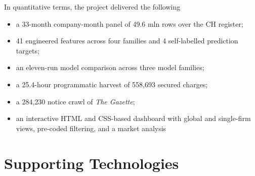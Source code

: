 \documentclass[    author={Samuel Menon Demelo; Sneha Saphala Ram Prasad; 
Viktor Ander Lindholm; Vishal Khatri},
               supervisor={Prof. Fernando Moreno-Pino},
                   degree={MSc},
                    title={Lloyds Commercial Banking Intelligence},
                 subtitle={Ranking SME Lending, Risk and Growth Prospects for Lloyds Banking Group},
                     type={},
                     year={2026}]{dissertation}
\begin{document}
\noindent
In quantitative terms, the project delivered the following
\begin{itemize}
    \item a 33-month company-month panel of 49.6 mln rows over the CH register;
    \item 41 engineered features across four families and 4 self-labelled prediction targets;
    \item an eleven-run model comparison across three model families;
    \item a 25.4-hour programmatic harvest of 558{,}693 secured charges;
    \item a 284{,}230 notice crawl of \emph{The Gazette};
    \item an interactive HTML and CSS-based dashboard with global and single-firm views, pre-coded filtering, and a market analysis 
\end{itemize}


\chapter*{Supporting Technologies}
\end{document}
